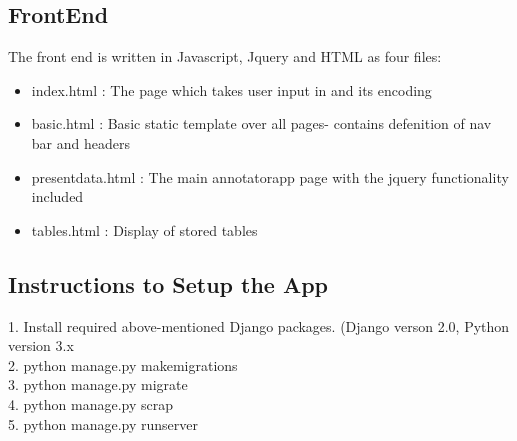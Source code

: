 \documentclass[12pt]{article}
\begin{document}
\subsection{FrontEnd}
The front end is written in Javascript, Jquery and HTML as four files:
\begin{itemize}
	\item index.html : The page which takes user input in and its encoding
	\item basic.html : Basic static template over all pages- contains defenition of nav bar and headers
	\item presentdata.html : The main annotatorapp page with the jquery functionality included
	\item tables.html : Display of stored tables
\end{itemize}

\subsection{Instructions to Setup the App}
1. Install required above-mentioned Django packages. (Django verson 2.0, Python version 3.x \\ 
2. python manage.py makemigrations \\
3. python manage.py migrate \\
4. python manage.py scrap \\
5. python manage.py runserver
\end{document}
